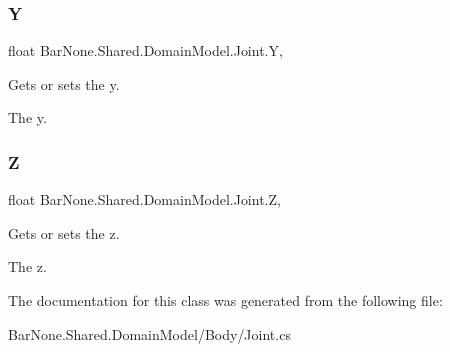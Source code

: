 \subsubsection{\texorpdfstring{Y}{Y}}
{\footnotesize\ttfamily float Bar\+None.\+Shared.\+Domain\+Model.\+Joint.\+Y\hspace{0.3cm}{\ttfamily [get]}, {\ttfamily [set]}}



Gets or sets the y. 

The y. \mbox{\label{class_bar_none_1_1_shared_1_1_domain_model_1_1_joint_adf6462a06f9aea08acc07998ef9cc233}} 
\subsubsection{\texorpdfstring{Z}{Z}}
{\footnotesize\ttfamily float Bar\+None.\+Shared.\+Domain\+Model.\+Joint.\+Z\hspace{0.3cm}{\ttfamily [get]}, {\ttfamily [set]}}



Gets or sets the z. 

The z. 

The documentation for this class was generated from the following file\+:\begin{DoxyCompactItemize}
\item 
Bar\+None.\+Shared.\+Domain\+Model/\+Body/Joint.\+cs\end{DoxyCompactItemize}
